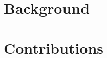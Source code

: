 \documentclass[12pt,french,english,twoside]{report} %
\begin{document}
\adjustmtc



\part{Background}




\part{Contributions}








%
%
%
\printbibliography[heading=bibintoc]


\appendix
\begin{appendices} %

\end{appendices}
\end{document}
